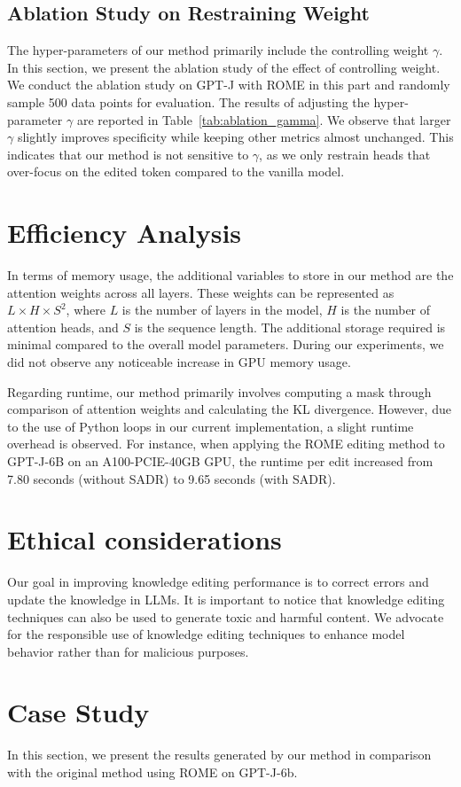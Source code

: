\subsection{Ablation Study on Restraining Weight}
\label{app:ablation}
The hyper-parameters of our method primarily include the controlling weight $\gamma$. 
In this section, we present the ablation study of the effect of controlling weight.
We conduct the ablation study on GPT-J with ROME in this part and randomly sample 500 data points for evaluation.
The results of adjusting the hyper-parameter $\gamma$ are reported in Table~\ref{tab:ablation_gamma}.
We observe that larger $\gamma$ slightly improves specificity while keeping other metrics almost unchanged. 
This indicates that our method is not sensitive to $\gamma $, as we only restrain heads that over-focus on the edited token compared to the vanilla model.




\section{Efficiency Analysis}

In terms of memory usage, the additional variables to store in our method are the attention weights across all layers. These weights can be represented as $L \times H \times S^2$, where $L$ is the number of layers in the model, $H$ is the number of attention heads, and $S$ is the sequence length. The additional storage required is minimal compared to the overall model parameters. During our experiments, we did not observe any noticeable increase in GPU memory usage.

Regarding runtime, our method primarily involves computing a mask through comparison of attention weights and calculating the KL divergence. However, due to the use of Python loops in our current implementation, a slight runtime overhead is observed. For instance, when applying the ROME editing method to GPT-J-6B on an A100-PCIE-40GB GPU, the runtime per edit increased from 7.80 seconds (without SADR) to 9.65 seconds (with SADR).

\section{Ethical considerations}
Our goal in improving knowledge editing performance is to correct errors and update the knowledge in LLMs. 
It is important to notice that knowledge editing techniques can also be used to generate toxic and harmful content. 
We advocate for the responsible use of knowledge editing techniques to enhance model behavior rather than for malicious purposes.

\clearpage
\section{Case Study}
In this section, we present the results generated by our method in comparison with the original method using ROME on GPT-J-6b.



